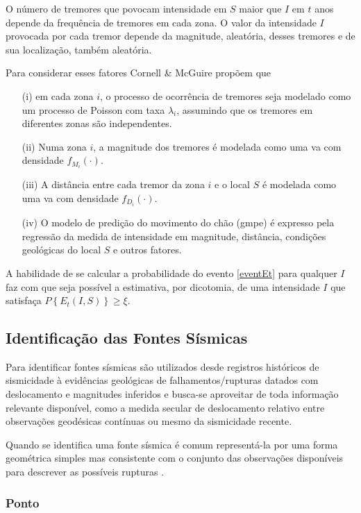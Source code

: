 O número de tremores que povocam intensidade em $S$ maior que $I$ em $t$ anos depende da frequência
de tremores em cada zona. O valor da intensidade $I$ provocada por cada tremor depende da magnitude,
aleatória, desses tremores e de sua localização, também aleatória.

Para considerar esses fatores Cornell \& McGuire propõem que
\begin{itemize}
\item[(i)] em cada zona $i$, o processo de ocorrência de tremores seja
modelado como um processo de Poisson com taxa $\lambda_i$, assumindo que os tremores em diferentes zonas são
independentes.
\item[(ii)] Numa zona $i$, a magnitude dos tremores é modelada como uma \gls{va}
com densidade $f_{M_i}(\cdot)$.
\item[(iii)] A distância entre cada tremor da zona $i$ e o local $S$ é modelada como uma \gls{va}
com densidade $f_{D_i}(\cdot)$.
\item[(iv)] O modelo de predição do movimento do chão (\gls{gmpe}) é expresso pela regressão da medida de intensidade
em magnitude, distância, condições geológicas do local $S$ e outros fatores.
\end{itemize}


A habilidade de se calcular a probabilidade do evento
\eqref{eventEt} para qualquer $I$ faz com que seja possível a estimativa, por dicotomia, de uma intensidade $I$ que satisfaça
$P\left\{ E_t(I, S) \right\} \geq \xi$.


\subsection{Identificação das Fontes Sísmicas}
Para identificar fontes sísmicas são utilizados desde registros históricos de sismicidade à evidências geológicas de
falhamentos/rupturas datados com deslocamento e magnitudes inferidos e busca-se aproveitar de toda informação relevante
disponível, como a medida secular de deslocamento relativo entre observações geodésicas contínuas ou mesmo da
sismicidade recente.

Quando se identifica uma fonte sísmica é comum representá-la por uma forma geométrica simples mas consistente com o
conjunto das observações disponíveis para descrever as possíveis rupturas \citep{crowley_2013}.

\subsubsection{Ponto}
\label{sec:point_source}

